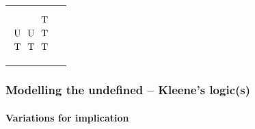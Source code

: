 \documentclass[xcolor=x11names]{beamer}
\renewcommand{\emph}[1]{\textbf{#1}}
\begin{document}
\begin{frame}
\begin{tabular}{cc}
\begin{minipage}{5.2cm}
\[\begin{tikzpicture}[scale=.5]
\node at (3.5,-1.5) {T};
\node at (1.5,-2.5) {U};
\node at (2.5,-2.5) {U};
\node at (3.5,-2.5) {T};
\node at (1.5,-3.5) {T};
\node at (2.5,-3.5) {T};
\node at (3.5,-3.5) {T};
\end{tikzpicture}\]
\end{minipage}
\end{tabular}
\end{frame}

\begin{frame}
	\frametitle{Modelling the undefined -- Kleene's logic(s)}
	\framesubtitle{Variations for implication}
\footnotesize


\end{frame}
\end{document}
